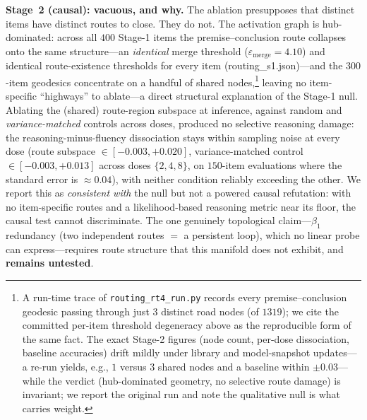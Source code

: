 \documentclass{article}
\begin{document}
\medskip
\noindent\textbf{Stage~2 (causal): vacuous, and why.} The ablation presupposes that distinct items
have distinct routes to close. They do not. The activation graph is hub-dominated: across all $400$
Stage-1 items the premise--conclusion route collapses onto the same structure---an \emph{identical}
merge threshold ($\varepsilon_{\text{merge}}=4.10$) and identical route-existence thresholds for every
item (routing\_s1.json)---and the $300$-item geodesics concentrate on a handful of shared
nodes,\footnote{A run-time trace of \texttt{routing\_rt4\_run.py} records every premise--conclusion
geodesic passing through just $3$ distinct road nodes (of $1319$); we cite the committed per-item
threshold degeneracy above as the reproducible form of the same fact. The exact Stage-2 figures
(node count, per-dose dissociation, baseline accuracies) drift mildly under library and
model-snapshot updates---a re-run yields, e.g., $1$ versus $3$ shared nodes and a baseline
within $\pm 0.03$---while the verdict (hub-dominated geometry, no selective route damage) is
invariant; we report the original run and note the qualitative null is what carries weight.} leaving no item-specific
``highways'' to ablate---a direct structural explanation of the
Stage-1 null. Ablating the (shared) route-region subspace at inference, against random and
\emph{variance-matched} controls across doses, produced no selective reasoning damage: the
reasoning-minus-fluency dissociation stays within sampling noise at every dose (route subspace
$\in[-0.003,+0.020]$, variance-matched control $\in[-0.003,+0.013]$ across doses $\{2,4,8\}$, on
$150$-item evaluations where the standard error is $\approx 0.04$), with neither condition reliably
exceeding the other. We report this as \emph{consistent with} the null but not a powered causal refutation: with
no item-specific routes and a likelihood-based reasoning metric near its floor, the causal test cannot
discriminate. The one genuinely topological claim---$\beta_1$ redundancy (two independent routes $=$ a
persistent loop), which no linear probe can express---requires route structure that this manifold does
not exhibit, and \textbf{remains untested}.
\end{document}
